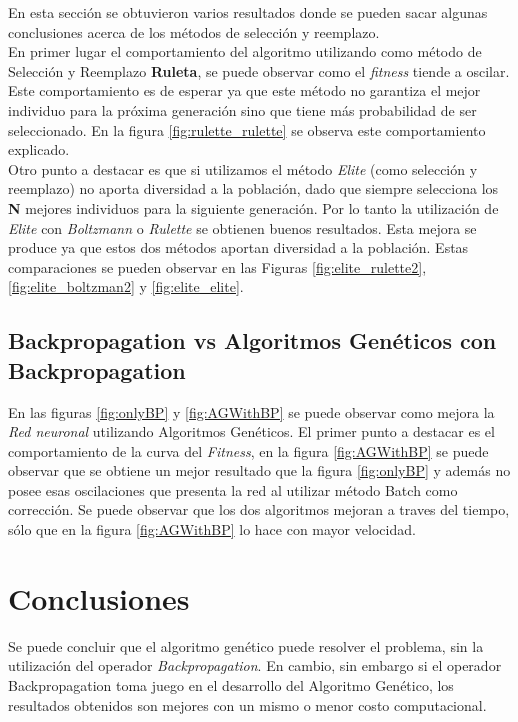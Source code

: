 \documentclass{sig-alternate}
\begin{document}
		En esta sección se obtuvieron varios resultados donde se pueden sacar algunas conclusiones acerca de los métodos de selección y reemplazo.\\
		En primer lugar el comportamiento del algoritmo utilizando como método de Selección y Reemplazo \textbf{Ruleta}, se puede observar como el \textit{fitness} tiende a oscilar. Este comportamiento es de esperar ya que este método no garantiza el mejor individuo para la próxima generación sino que tiene más probabilidad de ser seleccionado. En la figura \ref{fig:rulette_rulette} se observa este comportamiento explicado.\\
		Otro punto a destacar es que si utilizamos el método \textit{Elite} (como selección y reemplazo) no aporta diversidad a la población, dado que siempre selecciona los \textbf{N} mejores individuos para la siguiente generación. Por lo tanto la utilización de \textit{Elite} con \textit{Boltzmann} o \textit{Rulette} se obtienen buenos resultados. Esta mejora se produce ya que estos dos métodos aportan diversidad a la población. Estas comparaciones se pueden observar en las Figuras \ref{fig:elite_rulette2}, \ref{fig:elite_boltzman2} y \ref{fig:elite_elite}.


		\subsection{Backpropagation vs Algoritmos Genéticos con Backpropagation}

		En las figuras \ref{fig:onlyBP} y \ref{fig:AGWithBP} se puede observar como mejora la \textit{Red neuronal} utilizando Algoritmos Genéticos. El primer punto a destacar es el comportamiento de la curva del \textit{Fitness}, en la figura \ref{fig:AGWithBP} se puede observar que se obtiene un mejor resultado que la figura \ref{fig:onlyBP} y además no posee esas oscilaciones que presenta la red al utilizar método Batch como corrección. Se puede observar que los dos algoritmos mejoran a traves del tiempo, sólo que en la figura \ref{fig:AGWithBP} lo hace con mayor velocidad.
		
		\section{Conclusiones}
		
		Se puede concluir que el algoritmo genético puede resolver el problema, sin la utilización del operador \textit{Backpropagation}. En cambio, sin embargo si el operador Backpropagation toma juego en el desarrollo del Algoritmo Genético, los resultados obtenidos son mejores con un mismo o menor costo computacional.\\
\end{document}
